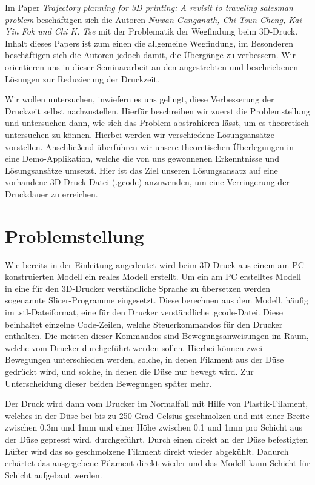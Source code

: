 \documentclass[12pt, a4paper]{article}
\begin{document}
Im Paper \textit{Trajectory planning for 3D printing: A revisit to traveling salesman problem} beschäftigen sich die Autoren \textit{Nuwan Ganganath, Chi-Tsun Cheng, Kai-Yin Fok und Chi K. Tse} \cite{Paper.2016} mit der Problematik der Wegfindung beim 3D-Druck. Inhalt dieses Papers ist zum einen die allgemeine Wegfindung, im Besonderen beschäftigen sich die Autoren jedoch damit, die Übergänge zu verbessern. Wir orientieren uns in dieser Seminararbeit an den angestrebten und beschriebenen Lösungen zur Reduzierung der Druckzeit.

Wir wollen untersuchen, inwiefern es uns gelingt, diese Verbesserung der Druckzeit selbst nachzustellen. Hierfür beschreiben wir zuerst die Problemstellung und untersuchen dann, wie sich das Problem abstrahieren lässt, um es theoretisch untersuchen zu können. Hierbei werden wir verschiedene Lösungsansätze vorstellen. Anschließend überführen wir unsere theoretischen Überlegungen in eine Demo-Applikation, welche die von uns gewonnenen Erkenntnisse und Lösungsansätze umsetzt. Hier ist das Ziel unseren Lösungsansatz auf eine vorhandene 3D-Druck-Datei (.gcode) anzuwenden, um eine Verringerung der Druckdauer zu erreichen. 

\newpage
\section{Problemstellung\label{kap:Problemstellung}}

Wie bereits in der Einleitung angedeutet wird beim 3D-Druck aus einem am PC konstruierten Modell ein reales Modell erstellt. Um ein am PC erstelltes Modell in eine für den 3D-Drucker verständliche Sprache zu übersetzen werden sogenannte Slicer-Programme eingesetzt. Diese berechnen aus dem Modell, häufig im .stl-Dateiformat, eine für den Drucker verständliche .gcode-Datei. Diese beinhaltet einzelne Code-Zeilen, welche Steuerkommandos für den Drucker enthalten. Die meisten dieser Kommandos sind Bewegungsanweisungen im Raum, welche vom Drucker durchgeführt werden sollen. Hierbei können zwei Bewegungen unterschieden werden, solche, in denen Filament aus der Düse gedrückt wird, und solche, in denen die Düse nur bewegt wird. Zur Unterscheidung dieser beiden Bewegungen später mehr.

Der Druck wird dann vom Drucker im Normalfall mit Hilfe von Plastik-Filament, welches in der Düse bei bis zu 250 Grad Celsius geschmolzen und mit einer Breite zwischen 0.3m und 1mm und einer Höhe zwischen 0.1 und 1mm pro Schicht aus der Düse gepresst wird, durchgeführt. Durch einen direkt an der Düse befestigten Lüfter wird das so geschmolzene Filament direkt wieder abgekühlt. Dadurch erhärtet das ausgegebene Filament direkt wieder und das Modell kann Schicht für Schicht aufgebaut werden.
\end{document}
